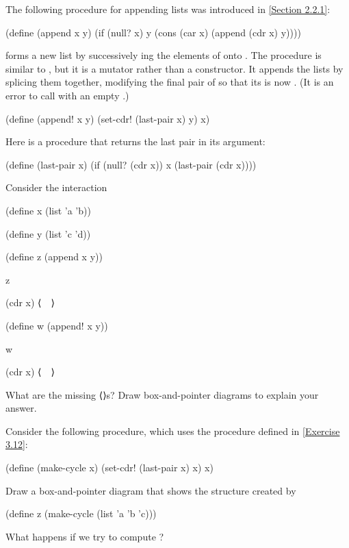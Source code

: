 \begin{exercise}
	\label{Exercise 3.12}
	The following procedure for appending lists was introduced in \cref{Section 2.2.1}:
	\begin{scheme}
	  (define (append x y)
	    (if (null? x)
	        y
	        (cons (car x) (append (cdr x) y))))
	\end{scheme}
	 forms a new list by successively ing the elements of  onto .
	The procedure  is similar to , but it is a mutator rather than a constructor.
	It appends the lists by splicing them together, modifying the final pair of  so that its  is now .
	(It is an error to call  with an empty .)
	\begin{scheme}
	  (define (append! x y)
	    (set-cdr! (last-pair x) y)
	    x)
	\end{scheme}
	Here  is a procedure that returns the last pair in its argument:
	\begin{scheme}
	  (define (last-pair x)
	  (if (null? (cdr x)) x (last-pair (cdr x))))
	\end{scheme}
	Consider the interaction
	\begin{scheme}
	  (define x (list 'a 'b))

	  (define y (list 'c 'd))

	  (define z (append x y))

	  z
	  ~~

	  (cdr x)
	  ⟨~~⟩

	  (define w (append! x y))

	  w
	  ~~

	  (cdr x)
	  ⟨~~⟩
	\end{scheme}
	What are the missing ⟨⟩s?
	Draw box-and-pointer diagrams to explain your answer.
\end{exercise}



\begin{exercise}
	\label{Exercise 3.13}
	Consider the following  procedure, which uses the  procedure defined in \cref{Exercise 3.12}:
	\begin{scheme}
	  (define (make-cycle x)
	    (set-cdr! (last-pair x) x)
	    x)
	\end{scheme}
	Draw a box-and-pointer diagram that shows the structure  created by
	\begin{scheme}
	  (define z (make-cycle (list 'a 'b 'c)))
	\end{scheme}
	What happens if we try to compute ?
\end{exercise}



